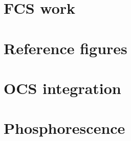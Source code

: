 \section{FCS work}
\clearpage

\section{Reference figures}

\clearpage

\section{OCS integration}

\clearpage
\section{Phosphorescence}\label{appendix:phosphorescence}
\clearpage

\clearpage

\clearpage

\clearpage

\clearpage
